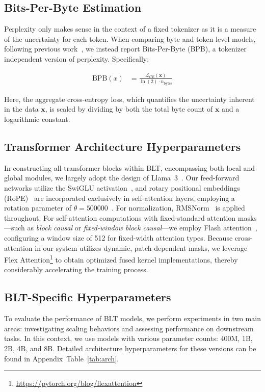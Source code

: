 \subsection{Bits-Per-Byte Estimation} Perplexity only makes sense in the context of a fixed tokenizer as it is a measure of the uncertainty for each token. When comparing byte and token-level models, following previous work~\citep{xue2022byt5, yu2023megabyte, wang2024mambabyte}, we instead report Bits-Per-Byte (BPB), a tokenizer independent version of perplexity. Specifically:

\begin{align}
    \text{BPB}(x)&= \frac{\mathcal{L}_{CE}(\pmb{x})}{\ln(2)\cdot n_{\text{bytes}}}
\end{align}

Here, the aggregate cross-entropy loss, which quantifies the uncertainty inherent in the data $\pmb{x}$, is scaled by dividing by both the total byte count of $\pmb{x}$ and a logarithmic constant.

\subsection{Transformer Architecture Hyperparameters} In constructing all transformer blocks within {\textsc BLT}, encompassing both local and global modules, we largely adopt the design of Llama~3~\citep{dubey2024llama}. Our feed-forward networks utilize the SwiGLU activation~\citep{swiglu}, and rotary positional embeddings (RoPE)~\citep{RoPe} are incorporated exclusively in self-attention layers, employing a rotation parameter of $\theta=500000$~\citep{xiong2024effective}. For normalization, RMSNorm~\citep{RMSNorm} is applied throughout. For self-attention computations with fixed-standard attention masks—such as \textit{block causal} or \textit{fixed-window block causal}—we employ Flash attention~\citep{dao2022flashattention}, configuring a window size of 512 for fixed-width attention types. Because cross-attention in our system utilizes dynamic, patch-dependent masks, we leverage Flex Attention\footnote{\url{https://pytorch.org/blog/flexattention}} to obtain optimized fused kernel implementations, thereby considerably accelerating the training process.

\subsection{{\textsc BLT}-Specific Hyperparameters}  
To evaluate the performance of {\textsc BLT} models, we perform experiments in two main areas: investigating scaling behaviors and assessing performance on downstream tasks. In this context, we use models with various parameter counts: 400M, 1B, 2B, 4B, and 8B. Detailed architecture hyperparameters for these versions can be found in Appendix~Table~\ref{tab:arch}. 

